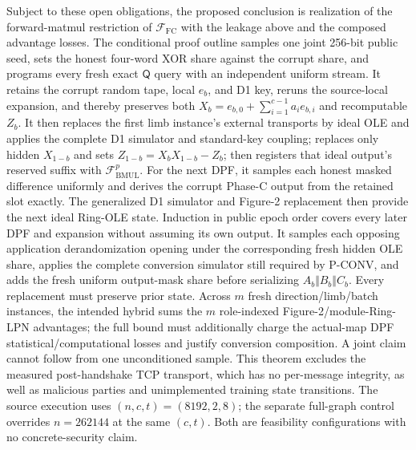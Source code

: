 \documentclass[11pt]{article}
\begin{document}
Subject to these open obligations, the proposed conclusion is realization of
the forward-matmul restriction of $\mathcal F_{\mathrm{FC}}$ with the leakage
above and the composed advantage losses. The conditional proof outline
samples one joint 256-bit public seed, sets the honest four-word XOR share
against the corrupt share, and programs every fresh exact $\mathsf Q$ query
with an independent uniform stream. It retains the corrupt random tape,
local $e_b$, and D1 key, reruns the source-local expansion, and thereby
preserves both
$X_b=e_{b,0}+\sum_{i=1}^{c-1}a_i e_{b,i}$ and recomputable $Z_b$. It then
replaces the first limb instance's external transports by ideal OLE and applies
the complete D1 simulator and standard-key coupling; replaces only hidden
$X_{1-b}$ and sets $Z_{1-b}=X_bX_{1-b}-Z_b$; then registers that ideal
output's reserved suffix with $\mathcal F_{\mathrm{BMUL}}^p$. For the next DPF,
it samples each honest masked difference uniformly and derives the corrupt
Phase-C output from the retained slot exactly. The generalized D1 simulator and
Figure-2 replacement then provide the next ideal Ring-OLE state. Induction in
public epoch order covers every later DPF and
expansion without assuming its own output. It samples each opposing application
derandomization opening under the corresponding fresh hidden OLE share, applies
the complete conversion simulator still required by P-CONV, and adds the fresh
uniform output-mask share before serializing $A_b\Vert B_b\Vert C_b$.
Every replacement must preserve prior state. Across $m$ fresh
direction/limb/batch instances, the intended hybrid sums the $m$ role-indexed
Figure-2/module-Ring-LPN advantages; the full bound must additionally charge
the actual-map DPF statistical/computational losses and justify conversion
composition. A joint claim cannot follow from one unconditioned sample.
This theorem excludes the measured post-handshake TCP transport, which has no
per-message integrity, as well as malicious parties and unimplemented training
state transitions. The source execution uses $(n,c,t)=(8192,2,8)$; the separate
full-graph control overrides $n=262144$ at the same $(c,t)$. Both are feasibility
configurations with no concrete-security claim.
\end{document}
